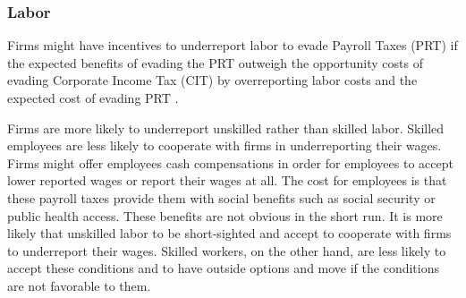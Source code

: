 \documentclass[
  12pt]{article}
\begin{document}
\begin{table}

\caption{\label{tbl-energy}Electric energy market in Colombia
(1981-1991).}


\end{table}%

\subsubsection{Labor}\label{labor}

Firms might have incentives to underreport labor to evade Payroll Taxes
(PRT) if the expected benefits of evading the PRT outweigh the
opportunity costs of evading Corporate Income Tax (CIT) by overreporting
labor costs and the expected cost of evading PRT \citep{Almunia2018}.

Firms are more likely to underreport unskilled rather than skilled
labor. Skilled employees are less likely to cooperate with firms in
underreporting their wages. Firms might offer employees cash
compensations in order for employees to accept lower reported wages or
report their wages at all. The cost for employees is that these payroll
taxes provide them with social benefits such as social security or
public health access. These benefits are not obvious in the short run.
It is more likely that unskilled labor to be short-sighted and accept to
cooperate with firms to underreport their wages. Skilled workers, on the
other hand, are less likely to accept these conditions and to have
outside options and move if the conditions are not favorable to them.
\end{document}
